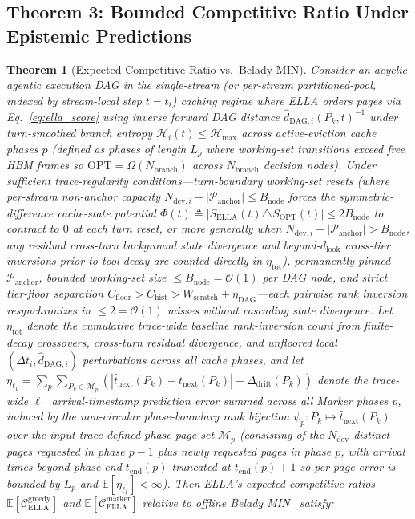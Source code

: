 \documentclass[conference,10pt]{IEEEtran}
\newtheorem{theorem}{Theorem}
\begin{document}
\subsection{Theorem 3: Bounded Competitive Ratio Under Epistemic Predictions}
\begin{theorem}[Expected Competitive Ratio vs.\ Belady MIN]
Consider an acyclic agentic execution DAG in the single-stream (or per-stream partitioned-pool, indexed by stream-local step $t = t_i$) caching regime where ELLA orders pages via Eq.~\eqref{eq:ella_score} using inverse forward DAG distance $\hat{d}_{\text{DAG},i}(P_k, t)^{-1}$ under turn-smoothed branch entropy $\mathcal{H}_i(t) \le \mathcal{H}_{\max}$ across active-eviction cache phases $p$ (defined as phases of length $L_p$ where working-set transitions exceed free HBM frames so $\text{OPT} = \Omega(N_{\text{branch}})$ across $N_{\text{branch}}$ decision nodes). Under sufficient trace-regularity conditions—turn-boundary working-set resets (where per-stream non-anchor capacity $N_{\text{dev},i} - |\mathcal{P}_{\text{anchor}}| \le B_{\text{node}}$ forces the symmetric-difference cache-state potential $\Phi(t) \triangleq |S_{\text{ELLA}}(t) \triangle S_{\text{OPT}}(t)| \le 2B_{\text{node}}$ to contract to $0$ at each turn reset, or more generally when $N_{\text{dev},i} - |\mathcal{P}_{\text{anchor}}| > B_{\text{node}}$, any residual cross-turn background state divergence and beyond-$d_{\text{look}}$ cross-tier inversions prior to tool decay are counted directly in $\eta_{\text{tot}}$), permanently pinned $\mathcal{P}_{\text{anchor}}$, bounded working-set size $\le B_{\text{node}} = \mathcal{O}(1)$ per DAG node, and strict tier-floor separation $C_{\text{floor}} > C_{\text{hist}} > W_{\text{scratch}} + \eta_{\text{DAG}}$—each pairwise rank inversion resynchronizes in $\le 2 = \mathcal{O}(1)$ misses without cascading state divergence. Let $\eta_{\text{tot}}$ denote the cumulative trace-wide baseline rank-inversion count from finite-decay crossovers, cross-turn residual divergence, and unfloored local $(\Delta t_i, \hat{d}_{\text{DAG},i})$ perturbations across all cache phases, and let $\eta_{\ell_1} = \sum_{p} \sum_{P_k \in \mathcal{M}_p} (|\hat{t}_{\text{next}}(P_k) - t_{\text{next}}(P_k)| + \Delta_{\text{drift}}(P_k))$ denote the trace-wide $\ell_1$ arrival-timestamp prediction error summed across all Marker phases $p$, induced by the non-circular phase-boundary rank bijection $\psi_p: P_k \mapsto \hat{t}_{\text{next}}(P_k)$ over the input-trace-defined phase page set $\mathcal{M}_p$ (consisting of the $N_{\text{dev}}$ distinct pages requested in phase $p-1$ plus newly requested pages in phase $p$, with arrival times beyond phase end $t_{\text{end}}(p)$ truncated at $t_{\text{end}}(p)+1$ so per-page error is bounded by $L_p$ and $\mathbb{E}[\eta_{\ell_1}] < \infty$). Then ELLA's expected competitive ratios $\mathbb{E}[\mathcal{C}_{\text{ELLA}}^{\text{greedy}}]$ and $\mathbb{E}[\mathcal{C}_{\text{ELLA}}^{\text{marker}}]$ relative to offline Belady MIN~\cite{belady1966study} satisfy:

\end{theorem}
\end{document}
